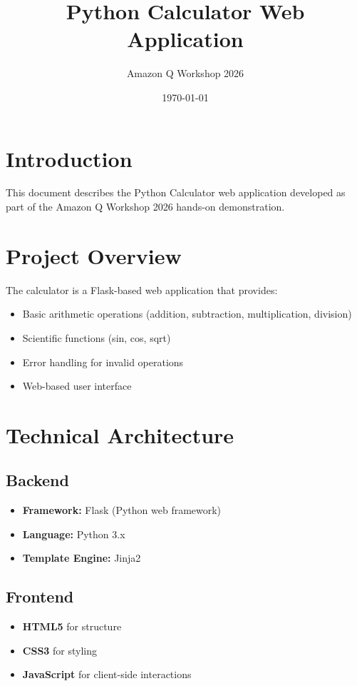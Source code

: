\documentclass[12pt,a4paper]{article}
\title{Python Calculator Web Application}
\author{Amazon Q Workshop 2026}
\date{\today}
\begin{document}
\maketitle

\section{Introduction}
This document describes the Python Calculator web application developed as part of the Amazon Q Workshop 2026 hands-on demonstration.

\section{Project Overview}
The calculator is a Flask-based web application that provides:
\begin{itemize}
    \item Basic arithmetic operations (addition, subtraction, multiplication, division)
    \item Scientific functions (sin, cos, sqrt)
    \item Error handling for invalid operations
    \item Web-based user interface
\end{itemize}

\section{Technical Architecture}
\subsection{Backend}
\begin{itemize}
    \item \textbf{Framework:} Flask (Python web framework)
    \item \textbf{Language:} Python 3.x
    \item \textbf{Template Engine:} Jinja2
\end{itemize}

\subsection{Frontend}
\begin{itemize}
    \item \textbf{HTML5} for structure
    \item \textbf{CSS3} for styling
    \item \textbf{JavaScript} for client-side interactions
\end{itemize}
\end{document}
